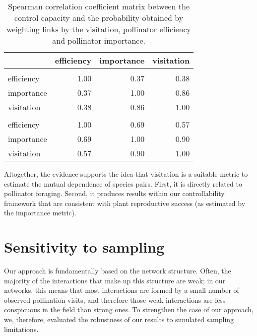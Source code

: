 \documentclass[a4paper]{artikel1}
\theoremstyle{definition}
\theoremstyle{definition}
\theoremstyle{definition}
\theoremstyle{remark}
\begin{document}
\begin{table}[!h]

\caption{\label{tab:tab-assumption-visitation}Spearman correlation coefficient matrix between the control capacity and the probability obtained by weighting links by the visitation, pollinator efficiency and pollinator importance.}
\centering
\fontsize{8}{10}\selectfont
\begin{tabular}[t]{lrrr}
\toprule
 & efficiency & importance & visitation\\
\midrule
\addlinespace[0.3em]
\multicolumn{4}{l}{\textbf{control capacity}}\\
\hspace{1em}efficiency & 1.00 & 0.37 & 0.38\\
\hspace{1em}importance & 0.37 & 1.00 & 0.86\\
\hspace{1em}visitation & 0.38 & 0.86 & 1.00\\
\addlinespace[0.3em]
\multicolumn{4}{l}{\textbf{superior probability}}\\
\hspace{1em}efficiency & 1.00 & 0.69 & 0.57\\
\hspace{1em}importance & 0.69 & 1.00 & 0.90\\
\hspace{1em}visitation & 0.57 & 0.90 & 1.00\\
\bottomrule
\end{tabular}
\end{table}

Altogether, the evidence supports the idea that visitation is a suitable
metric to estimate the mutual dependence of species pairs. First, it is
directly related to pollinator foraging. Second, it produces results
within our controllability framework that are consistent with plant
reproductive success (as estimated by the importance metric).

\clearpage

\section{Sensitivity to sampling}\label{undersampling}

Our approach is fundamentally based on the network structure. Often, the
majority of the interactions that make up this structure are weak; in
our networks, this means that most interactions are formed by a small
number of observed pollination visits, and therefore those weak
interactions are less conspicuous in the field than strong ones. To
strengthen the case of our approach, we, therefore, evaluated the
robustness of our results to simulated sampling limitations.
\end{document}

